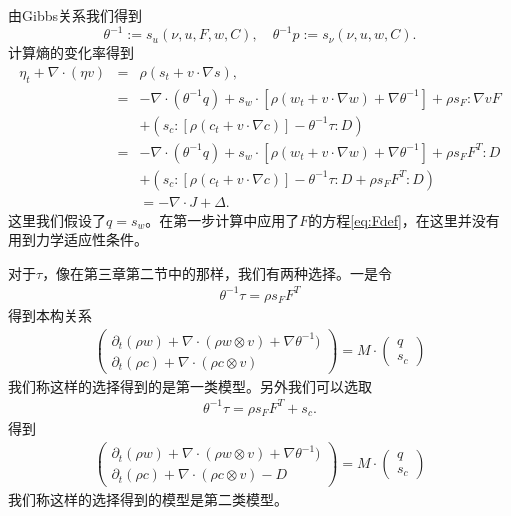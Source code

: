 由Gibbs关系我们得到
$$\theta^{-1}:=s_{u} (\nu,u,F, w,C), \quad \theta^{-1} p := s_\nu (\nu,u,w,C).$$
计算熵的变化率得到
\begin{eqnarray*}
		\eta_t + \nabla \cdot (\eta v) &=& \rho (s_t + v \cdot \nabla s), \\
		&=& -\nabla \cdot (\theta^{-1} q) + s_w \cdot [\rho (w_t + v \cdot \nabla w) + \nabla \theta^{-1}] + \rho s_F : \nabla v F  \\
		&& + (s_c:[\rho (c_t + v \cdot \nabla c)] - \theta^{-1} \tau : D) \\
		&=& -\nabla \cdot (\theta^{-1} q) + s_w \cdot [\rho (w_t + v \cdot \nabla w)+\nabla \theta^{-1}] + \rho s_F F^T : D  \\
		&& + (s_c:[\rho (c_t + v \cdot \nabla c)] - \theta^{-1} \tau : D + \rho s_F F^T : D)  \\
		&& = -\nabla \cdot J + \Delta.
\end{eqnarray*}
这里我们假设了$q=s_w$。在第一步计算中应用了$F$的方程\eqref{eq:Fdef}，在这里并没有用到力学适应性条件。

对于$\tau$，像在第三章第二节中的那样，我们有两种选择。一是令
\begin{eqnarray*}
\theta^{-1} \tau = \rho s_F F^T 
\end{eqnarray*}
得到本构关系
\begin{eqnarray}\label{eq:finite1}
\left( \begin{array}{c} \partial_t (\rho w) + \nabla \cdot (\rho w \otimes v) + \nabla \theta^{-1}) \\
	\partial_t (\rho c) + \nabla \cdot (\rho c \otimes v) \end{array} \right)
=
M \cdot \left( \begin{array}{c} q \\ s_c \end{array} \right)
\end{eqnarray}
我们称这样的选择得到的是第一类模型。另外我们可以选取
\begin{eqnarray*}
	\theta^{-1} \tau = \rho s_F F^T + s_c.
\end{eqnarray*}
得到
\begin{eqnarray}\label{eq:finite2}
\left( \begin{array}{c} \partial_t (\rho w) + \nabla \cdot (\rho w \otimes v) + \nabla \theta^{-1}) \\
	\partial_t (\rho c) + \nabla \cdot (\rho c \otimes v) - D \end{array} \right)
=
M \cdot \left( \begin{array}{c} q \\ s_c  \end{array} \right)
\end{eqnarray}
我们称这样的选择得到的模型是第二类模型。

